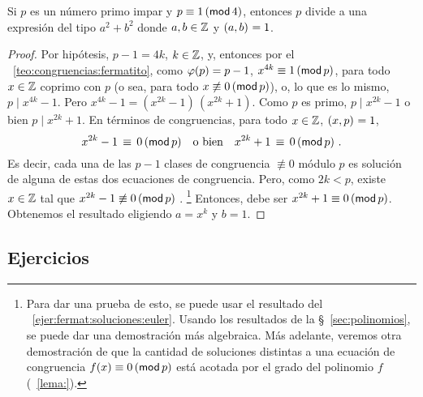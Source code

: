 \begin{lemaFermat}[Reciprocidad]\label{lema:fermat:reciprocidad}
	Si $p$ es un n\'umero primo impar y $p\equiv 1\tmodulo[4]$,
	entonces $p$ divide a una expresi\'on del tipo $a^2+b^2$ donde
	$a,b\in\Enteros$ y $\mcd{a,b}=1$.
\end{lemaFermat}

\begin{proof}
	Por hip\'otesis, $p-1=4k$, $k\in\Enteros$, y, entonces por el
	\teoname~\ref{teo:congruencias:fermatito}, como $\eulerphi(p)=p-1$,
	$x^{4k}\equiv 1\tmodulo[p]$, para todo $x\in\Enteros$ coprimo con $p$
	(o sea, para todo $x\not\equiv 0\tmodulo[p]$), o, lo que es lo mismo,
	$p\mid x^{4k}-1$. Pero $x^{4k}-1=(x^{2k}-1)\,(x^{2k}+1)$. Como $p$ es
	primo, $p\mid x^{2k}-1$ o bien $p\mid x^{2k}+1$. En t\'erminos de
	congruencias, para todo $x\in\Enteros$, $\mcd{x,p}=1$,
	\begin{displaymath}
		x^{2k}-1\,\equiv\,0\tmodulo[p]
			\quad\text{o bien}\quad
			x^{2k}+1\,\equiv\,0\tmodulo[p]
			\text{ .}
	\end{displaymath}
	Es decir, cada una de las $p-1$ clases de congruencia $\not\equiv 0$
	m\'odulo $p$ es soluci\'on de alguna de estas dos ecuaciones de
	congruencia. Pero, como $2k<p$, existe $x\in\Enteros$ tal que
	$x^{2k}-1\not\equiv 0\tmodulo[p]$ \quedacomoejercicio.%
	\footnote{
		Para dar una prueba de esto, se puede usar el resultado del
		\ejername~\ref{ejer:fermat:soluciones:euler}.
		Usando los resultados de la \S~\ref{sec:polinomios}, se
		puede dar una demostraci\'on m\'as algebraica.
		M\'as adelante, veremos otra demostraci\'on de que la
		cantidad de soluciones distintas a una ecuaci\'on de
		congruencia $f(x)\equiv 0\tmodulo[p]$ est\'a acotada por
		el grado del polinomio $f$ (\lemaname~\ref{lema:}).
	}
	Entonces, debe ser $x^{2k}+1\equiv 0\tmodulo[p]$.
	Obtenemos el resultado eligiendo $a=x^k$ y $b=1$.
\end{proof}

\subsection*{Ejercicios}


